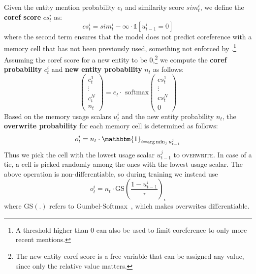 \documentclass[12pt]{thesis-umich}[thesis]
\newcommand{\actoverwrite}{\textsc{overwrite}\xspace}
\newcommand{\mysim}{\mathit{sim}}
\newcommand{\cs}{\mathit{cs}}
\begin{document}
Given the entity mention probability $e_t$ and similarity score $\mysim_{t}^{i}$, we define the \textbf{coref score} $\cs_{t}^{i}$ as:
\begin{equation} \label{coref_score_eqn}
	\cs_{t}^{i} = \mysim_{t}^{i} - \infty \cdot \mathds{1} [u^i_{t-1} = 0]
\end{equation}
where the second term ensures that the model does not predict coreference with a memory cell that has not been previously used, something not enforced by \citet{liu2019referential}.\footnote{A threshold higher than 0 can also be used to limit coreference to only more recent mentions.} Assuming the coref score for a new entity to be 0,\footnote{The new entity coref score is a free variable that can be assigned any value, since only the relative value matters.} we compute the \textbf{coref probability} $c_{t}^{i}$ and \textbf{new entity probability} $n_t$ as follows:
\begin{equation}
	\label{coref_over_eqn}
	\begin{pmatrix}
		c_t^1 \\
		\vdots \\
		c_t^N \\
		n_t
	\end{pmatrix} = e_t \cdot \text{ softmax}
	\begin{pmatrix}
		\cs_{t}^{1} \\
		\vdots \\
		\cs_{t}^{N} \\
		0
	\end{pmatrix}
\end{equation}
Based on the memory usage scalars $u^i_t$ and the new entity probability $n_t$, the \textbf{overwrite probability} for each memory cell is determined as follows:
\begin{equation}\label{over_eqn_inf}
	o_t^{i} = n_t \cdot \mathbbm{1}_{i = \arg\min_j u^j_{t-1}}
\end{equation}
Thus we pick the cell with the lowest usage scalar $u^j_{t-1}$ to \actoverwrite. In case of a tie, a cell is picked randomly among the ones with the lowest usage scalar.
The above operation is non-differentiable,
so during training we instead use \begin{equation}\label{over_eqn_train}
	o_t^{i} = n_t \cdot \text{GS}\left(\frac{1 - u_{t-1}^{i}}{\tau}\right)_i
\end{equation}
where $\text{GS}(.)$ refers to Gumbel-Softmax~\cite{jang2017categorical}, which makes overwrites differentiable. 
\end{document}
